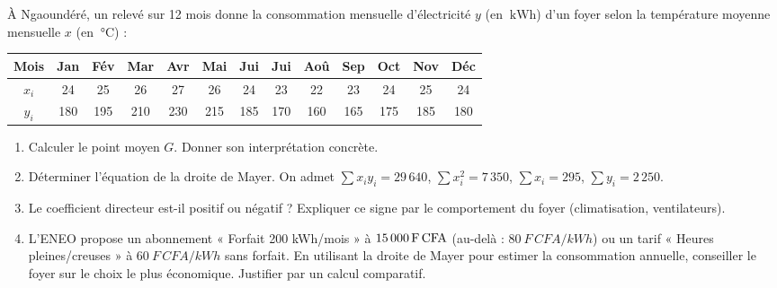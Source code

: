 \documentclass[11pt]{article}
\begin{document}
\begin{exercice}
À Ngaoundéré, un relevé sur 12 mois donne la consommation mensuelle d'électricité $y$ (en $\SI{}{\kilo\watt\hour}$) d'un foyer selon la température moyenne mensuelle $x$ (en $\SI{}{\celsius}$) :
\begin{center}
\begin{tabular}{|c|c|c|c|c|c|c|c|c|c|c|c|c|}
\hline
Mois & Jan & Fév & Mar & Avr & Mai & Jui & Jui & Aoû & Sep & Oct & Nov & Déc \\ \hline
$x_i$ & 24 & 25 & 26 & 27 & 26 & 24 & 23 & 22 & 23 & 24 & 25 & 24 \\ \hline
$y_i$ & 180 & 195 & 210 & 230 & 215 & 185 & 170 & 160 & 165 & 175 & 185 & 180 \\ \hline
\end{tabular}
\end{center}
\begin{enumerate}
    \item Calculer le point moyen $G$. Donner son interprétation concrète.
    \item Déterminer l'équation de la droite de Mayer. On admet $\sum x_i y_i = 29\,640$, $\sum x_i^2 = 7\,350$, $\sum x_i = 295$, $\sum y_i = 2\,250$.
    \item Le coefficient directeur est-il positif ou négatif ? Expliquer ce signe par le comportement du foyer (climatisation, ventilateurs).
    \item L'ENEO propose un abonnement « Forfait 200 kWh/mois » à $\SI{15\,000}{F\,CFA}$ (au-delà : $\SI{80}{F\,CFA/kWh}$) ou un tarif « Heures pleines/creuses » à $\SI{60}{F\,CFA/kWh}$ sans forfait. En utilisant la droite de Mayer pour estimer la consommation annuelle, conseiller le foyer sur le choix le plus économique. Justifier par un calcul comparatif.
\end{enumerate}
\end{exercice}
\end{document}
